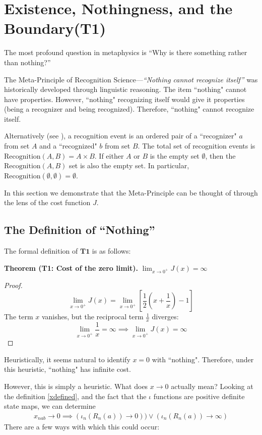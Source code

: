 \documentclass[11pt,a4paper]{article}
\begin{document}
\section{Existence, Nothingness, and the Boundary(T1)}

The most profound question in metaphysics is ``Why is there something rather than nothing?'' 

The Meta-Principle of Recognition Science—\textit{``Nothing cannot recognize itself''} was historically developed through linguistic reasoning. The item ``nothing" cannot have properties. However, ``nothing" recognizing itself would give it properties (being a recognizer and being recognized). Therefore, ``nothing" cannot recognize itself.

Alternatively (see \cite{CoherentComparisonLedger}), a recognition event is an ordered pair of a ``recognizer" $a$ from set $A$ and a ``recognized" $b$ from set $B$. The total set of recognition events is $\mathrm{Recognition}(A,B)=A\times B$. If either $A$ or $B$ is the empty set $\emptyset$, then the $\mathrm{Recognition}(A,B)$ set is also the empty set. In particular, $\mathrm{Recognition}(\emptyset,\emptyset)=\emptyset$.

In this section we demonstrate that the Meta-Principle can be thought of through the lens of the cost function $J$.

\subsection{The Definition of ``Nothing''}
The formal definition of $\textbf{T1}$ is as follows:

\textbf{Theorem (T1: Cost of the zero limit).}
$ \lim_{x \to 0^+} J(x)=\infty$
\begin{proof}
\begin{equation}
    \lim_{x \to 0^+} J(x) = \lim_{x \to 0^+} \left[ \frac{1}{2}\left(x + \frac{1}{x}\right) - 1 \right]
\end{equation}
The term $x$ vanishes, but the reciprocal term $\frac{1}{x}$ diverges:
\begin{equation}
    \lim_{x \to 0^+} \frac{1}{x} = \infty \implies \lim_{x \to 0^+} J(x) = \infty
\end{equation}
\end{proof}

Heuristically, it seems natural to identify $x=0$ with ``nothing". 
Therefore, under this heuristic, ``nothing" has infinite cost. 

However, this is simply a heuristic. What does $x\rightarrow0$ actually mean? Looking at the definition \ref{xdefined}, and the fact that the $\iota$ functions are positive definite state maps, we can determine
\begin{align}
    x_{nab}\rightarrow0 \implies (\iota_n(R_n(a))\rightarrow0))\lor(\iota_n(R_n(a))\rightarrow\infty)
\end{align}
There are a few ways with which this could occur:
\end{document}
